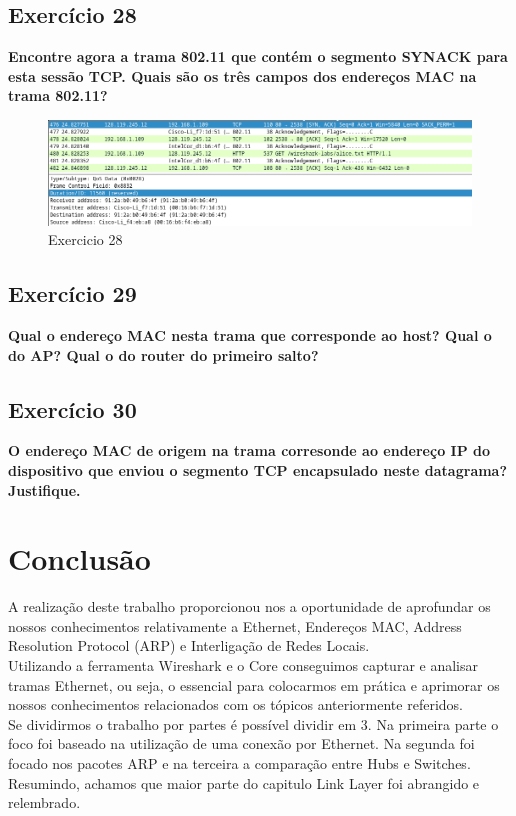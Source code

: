\documentclass[a4paper]{report}
\begin{document}
\section{Exercício 28}
\textbf{Encontre agora a trama 802.11 que contém o segmento SYNACK para esta
    sessão TCP. Quais são os três campos dos endereços MAC na trama 802.11?}
\begin{figure}[H]
    \centering 
    \includegraphics[width=\textwidth]{images/Ex28.png}  
    \caption{Exercicio 28}
    \label{fig:ex28}
\end{figure}

\section{Exercício 29}
\textbf{Qual o endereço MAC nesta trama que corresponde ao host? Qual o do AP?
    Qual o do router do primeiro salto?}

\section{Exercício 30}
\textbf{O endereço MAC de origem na trama corresonde ao endereço IP do
    dispositivo que enviou o segmento TCP encapsulado neste datagrama?
    Justifique.}

\chapter{Conclusão}
A realização deste trabalho proporcionou nos a oportunidade de aprofundar os
nossos conhecimentos relativamente a Ethernet, Endereços MAC, Address Resolution
Protocol (ARP) e Interligação de Redes Locais.\\
Utilizando a ferramenta Wireshark e o Core conseguimos capturar e analisar
tramas Ethernet, ou seja, o essencial para colocarmos em prática e aprimorar os
nossos conhecimentos relacionados com os tópicos anteriormente referidos.\\
Se dividirmos o trabalho por partes é possível dividir em 3. Na primeira parte o
foco foi baseado na utilização de uma conexão por Ethernet. Na segunda foi
focado nos pacotes ARP e na terceira a comparação entre Hubs e Switches.
Resumindo, achamos que maior parte do capitulo Link Layer foi abrangido e
relembrado.
\end{document}
